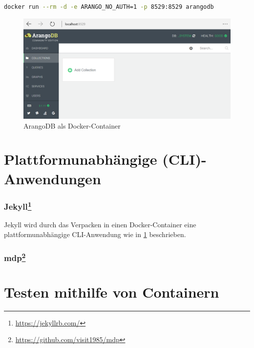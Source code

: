 \begin{lstlisting}[caption=Docker-Kommando zum Starten von ArangoDB, language=bash, label=lst:docker-run-arangodb]
docker run --rm -d -e ARANGO_NO_AUTH=1 -p 8529:8529 arangodb
\end{lstlisting}

\begin{figure}[htbp]
    \centering
    \includegraphics[width=0.8\linewidth,clip]{images/arangodb-demo}
    \caption{ArangoDB als Docker-Container}
\label{fig:arangodb-result}
\end{figure}



\section{Plattformunabhängige (CLI)-Anwendungen}
\label{sec:cross-platform-applications}

\subsubsection{Jekyll\protect\footnote{\url{https://jekyllrb.com/}}}

Jekyll wird durch das Verpacken in einen Docker-Container eine plattformunabhängige CLI-Anwendung wie in \cref{sec:cross-platform-applications} beschrieben.

\subsubsection{mdp\protect\footnote{\url{https://github.com/visit1985/mdp}}}


\section{Testen mithilfe von Containern}
\label{sec:containerbasiertes-testen}

